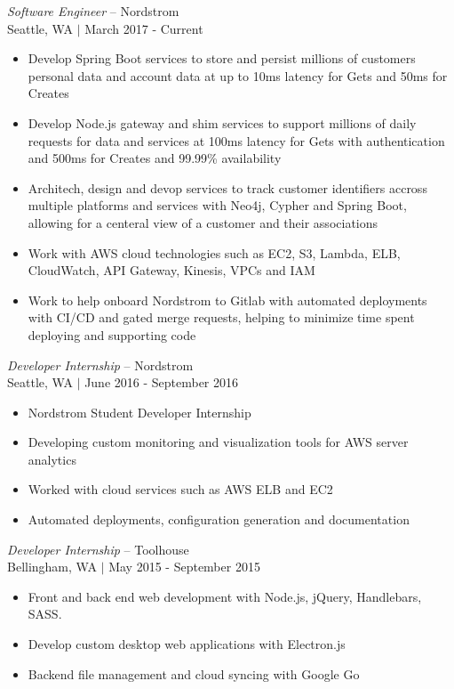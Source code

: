 \documentclass[line,margin]{res}
\begin{document}
\begin{resume}
	{\sl Software Engineer} -- {\footnotesize Nordstrom} \\
	{\footnotesize Seattle, WA $|$  March 2017 - Current}
	\begin{itemize} \itemsep -2pt
		\item Develop Spring Boot services to store and persist millions of customers personal data and account data
			at up to 10ms latency for Gets and 50ms for Creates
		\item Develop Node.js gateway and shim services to support millions of daily requests for data and services at
			100ms latency for Gets with authentication and 500ms for Creates and 99.99\% availability
		\item Architech, design and devop services to track customer identifiers accross multiple platforms and services
			with Neo4j, Cypher and Spring Boot, allowing for a centeral view of a customer and their associations
		\item Work with AWS cloud technologies such as EC2, S3, Lambda, ELB, CloudWatch, API Gateway, Kinesis, VPCs and IAM
		\item Work to help onboard Nordstrom to Gitlab with automated deployments with CI/CD and gated merge requests,
			helping to minimize time spent deploying and supporting code
	\end{itemize}
	{\sl Developer Internship} -- {\footnotesize Nordstrom} \\
	{\footnotesize Seattle, WA $|$  June 2016 - September 2016}
	\begin{itemize} \itemsep -2pt
		\item Nordstrom Student Developer Internship
		\item Developing custom monitoring and visualization tools for AWS server analytics
		\item Worked with cloud services such as AWS ELB and EC2
		\item Automated deployments, configuration generation and documentation
	\end{itemize}
	{\sl Developer Internship} -- {\footnotesize Toolhouse} \\
	{\footnotesize Bellingham, WA $|$  May 2015 - September 2015}
	\begin{itemize} \itemsep -2pt
		\item Front and back end web development with Node.js, jQuery, Handlebars, SASS.
		\item Develop custom desktop web applications with Electron.js
		\item Backend file management and cloud syncing with Google Go

\end{itemize}
\end{resume}
\end{document}
